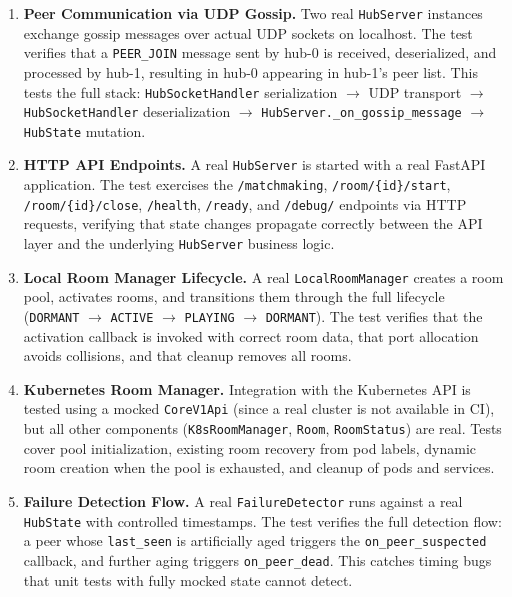 \begin{enumerate}
    \item \textbf{Peer Communication via UDP Gossip.}
          Two real \texttt{HubServer} instances exchange gossip messages over actual UDP sockets on localhost.
          The test verifies that a \texttt{PEER\_JOIN} message sent by hub-0 is received, deserialized, and processed by hub-1, resulting in hub-0 appearing in hub-1's peer list.
          This tests the full stack: \texttt{HubSocketHandler} serialization $\rightarrow$ UDP transport $\rightarrow$ \texttt{HubSocketHandler} deserialization $\rightarrow$ \texttt{HubServer.\_on\_gossip\_message} $\rightarrow$ \texttt{HubState} mutation.

    \item \textbf{HTTP API Endpoints.}
          A real \texttt{HubServer} is started with a real FastAPI application.
          The test exercises the \texttt{/matchmaking}, \texttt{/room/\{id\}/start}, \texttt{/room/\{id\}/close}, \texttt{/health}, \texttt{/ready}, and \texttt{/debug/} endpoints via HTTP requests, verifying that state changes propagate correctly between the API layer and the underlying \texttt{HubServer} business logic.

    \item \textbf{Local Room Manager Lifecycle.}
          A real \texttt{LocalRoomManager} creates a room pool, activates rooms, and transitions them through the full lifecycle (\texttt{DORMANT} $\rightarrow$ \texttt{ACTIVE} $\rightarrow$ \texttt{PLAYING} $\rightarrow$ \texttt{DORMANT}).
          The test verifies that the activation callback is invoked with correct room data, that port allocation avoids collisions, and that cleanup removes all rooms.

    \item \textbf{Kubernetes Room Manager.}
          Integration with the Kubernetes API is tested using a mocked \texttt{CoreV1Api} (since a real cluster is not available in CI), but all other components (\texttt{K8sRoomManager}, \texttt{Room}, \texttt{RoomStatus}) are real.
          Tests cover pool initialization, existing room recovery from pod labels, dynamic room creation when the pool is exhausted, and cleanup of pods and services.

    \item \textbf{Failure Detection Flow.}
          A real \texttt{FailureDetector} runs against a real \texttt{HubState} with controlled timestamps.
          The test verifies the full detection flow: a peer whose \texttt{last\_seen} is artificially aged triggers the \texttt{on\_peer\_suspected} callback, and further aging triggers \texttt{on\_peer\_dead}.
          This catches timing bugs that unit tests with fully mocked state cannot detect.


\end{enumerate}
